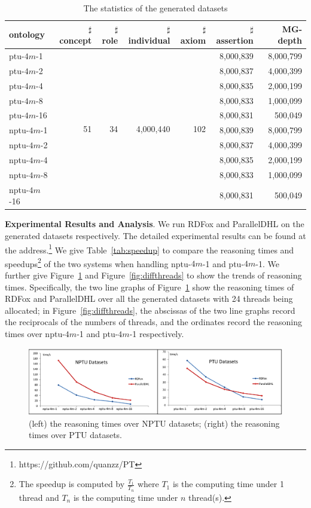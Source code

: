 \begin{table}
\centering
\caption{The statistics of the generated datasets}
\begin{tabular}{|l|r|r|r|r|r|r|}
\hline
ontology&$\sharp$concept&$\sharp$role&$\sharp$individual&$\sharp$axiom&$\sharp$assertion&MG-depth\\
\hline
ptu-$4m$-1&\multirow{10}{*}{51}&\multirow{10}{*}{34}&\multirow{10}{*}{4,000,440}&\multirow{10}{*}{102}&8,000,839&8,000,799\\
ptu-$4m$-2&&&&&8,000,837&4,000,399\\
ptu-$4m$-4&&&&&8,000,835&2,000,199\\
ptu-$4m$-8&&&&&8,000,833&1,000,099\\
ptu-$4m$-16&&&&&8,000,831&500,049\\
nptu-$4m$-1&&&&&8,000,839&8,000,799\\
nptu-$4m$-2&&&&&8,000,837&4,000,399\\
nptu-$4m$-4&&&&&8,000,835&2,000,199\\
nptu-$4m$-8&&&&&8,000,833&1,000,099\\
nptu-$4m$-16&&&&&8,000,831&500,049\\
\hline
\end{tabular}
\label{tab:generated}
\end{table}

\textbf{Experimental Results and Analysis}.
We run RDFox and ParallelDHL on the generated datasets respectively. The detailed experimental results
can be found at the address.\footnote{https://github.com/quanzz/PT} We give Table~\ref{tab:speedup} to compare the reasoning times and
speedups\footnote{The speedup is computed by $\frac{T_1}{T_n}$ where $T_1$ is the computing time
under 1 thread and $T_n$ is the computing time under $n$ thread(s).}
of the two systems when handling nptu-$4m$-1 and ptu-$4m$-1.
We further give Figure~\ref{fig:diffdepths} and Figure~\ref{fig:diffthreads} to show the trends of
reasoning times. Specifically, the two line graphs of Figure~\ref{fig:diffdepths}
show the reasoning times of RDFox and ParallelDHL over
all the generated datasets with 24 threads being allocated;
in Figure~\ref{fig:diffthreads},
the abscissas of the two line graphs record the reciprocals of the numbers of threads, and
the ordinates record the reasoning times over nptu-$4m$-1 and ptu-$4m$-1 respectively.

\begin{figure}[htbp]
\begin{center}
\includegraphics[width=1\textwidth]{fig-diff-depths.eps}
\caption{(left) the reasoning times over NPTU datasets; (right) the reasoning times over PTU datasets.}
\label{fig:diffdepths}
\end{center}
\end{figure}


